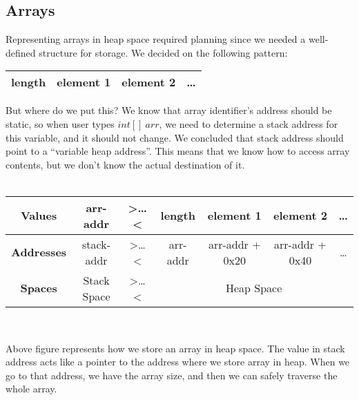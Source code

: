 \documentclass{article}
\begin{document}
\subsection{Arrays}
\label{arrays}
Representing arrays in heap space required planning since we needed a well-defined structure for storage. We decided on the following pattern:

\begin{center}
  \begin{tabular}{ | l | l | l | l | }
    \hline
    length & element 1 & element 2 & \ldots \\
    \hline
  \end{tabular}
\end{center}
But where do we put this? We know that array identifier's address should be static, so when user types $int[]\ arr$, we need to determine a stack address for this variable, and it should not change. We concluded that stack address should point to a ``variable heap address''. This means that we know how to access array contents, but we don't know the actual destination of it. \\
\\
\begin{tabular}{ | c | c   c   c | c | c | c | }
  \hline
  \textbf{Values} & arr-addr & \textgreater \ldots \textless & length & element 1 & element 2 & \ldots \\
  \hline
  \textbf{Addresses} & stack-addr & \textgreater \ldots \textless & arr-addr & arr-addr + 0x20 & arr-addr + 0x40 & \ldots \\
  \hline
  \textbf{Spaces} & Stack Space & \textgreater \ldots \textless & \multicolumn{4}{c|}{ Heap Space } \\
  \hline
\end{tabular} \\

\par Above figure represents how we store an array in heap space. The value in stack address acts like a pointer to the address where we store array in heap. When we go to that address, we have the array size, and then we can safely traverse the whole array.
\newpage
\end{document}
